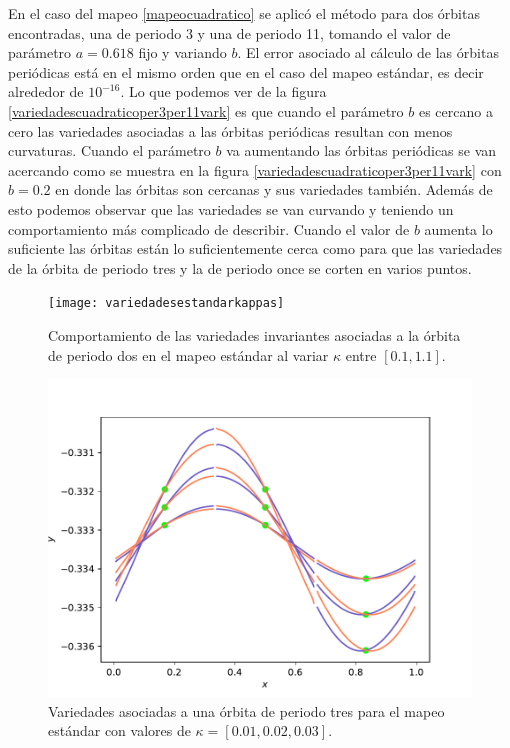 En el caso del mapeo \eqref{mapeocuadratico} se aplic\'o el m\'etodo para dos \'orbitas encontradas, una de periodo 3 y una de periodo 11, tomando el valor de par\'ametro $a=0.618$  fijo y variando $b$. El error asociado al c\'alculo de las \'orbitas peri\'odicas est\'a en el mismo orden que en el caso del mapeo est\'andar, es decir alrededor de $10^{-16}$. Lo que podemos ver de la figura \ref{variedadescuadraticoper3per11vark} es que cuando el par\'ametro $b$ es cercano a cero las variedades asociadas a las \'orbitas peri\'odicas resultan con menos curvaturas. Cuando el par\'ametro $b$ va aumentando las \'orbitas peri\'odicas se van acercando como se muestra en la figura \ref{variedadescuadraticoper3per11vark} con $b=0.2$ en donde las \'orbitas son cercanas y sus variedades tambi\'en. Adem\'as de esto podemos observar que las variedades se van curvando y teniendo un comportamiento m\'as complicado de describir. Cuando el valor de $b$ aumenta lo suficiente las \'orbitas est\'an lo suficientemente cerca como para que las variedades de la \'orbita de periodo tres y la de periodo once se corten en varios puntos. \\


\begin{figure}[H]
	\centering
	\texttt{[image: variedadesestandarkappas]}
	\caption{Comportamiento de las variedades invariantes asociadas a la \'orbita de periodo dos en el mapeo est\'andar al variar $\kappa$ entre $[0.1,1.1]$.}
	\label{variedadesestandarkappasv}
\end{figure}

\begin{figure}[H]
	\centering
	\includegraphics[scale=0.5]{variedadesestperiodo3kvar}
	\caption{Variedades asociadas a una \'orbita de periodo tres para el mapeo est\'andar con valores de $\kappa = [0.01,0.02,0.03]$. }
	\label{vairedadesperiodo3kvariable}
\end{figure}

